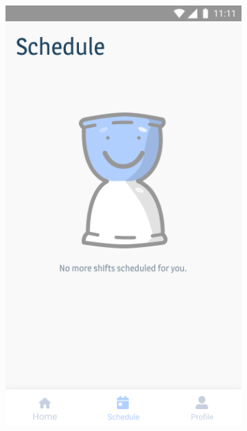 \documentclass[twoside]{ctuthesis}
\begin{document}
\begin{figure}[h]
	\centering
	\begin{subfigure}{.5\textwidth}
		\centering
		\includegraphics[width=.9\linewidth]{img/v1-main-home-schedule-empty.png}
		\label{fig:main-schedule-empty}
	\end{subfigure}%
	\begin{subfigure}[h!]{.5\textwidth}
		\centering

\end{subfigure}
\end{figure}
\end{document}
